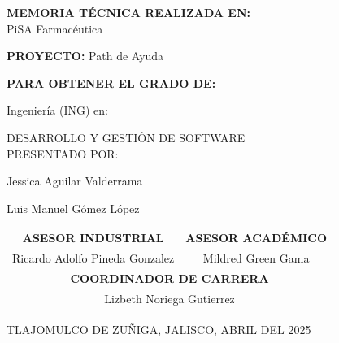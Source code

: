 \documentclass[12pt,letterpaper,spanish, xcolor=table]{report}
\begin{document}
\begin{center}
	
\large{\textbf{MEMORIA TÉCNICA REALIZADA EN:}}
 \\ PiSA Farmacéutica

\centerline{\hbox{}}

\large{\textbf{PROYECTO:} Path de Ayuda}

\vspace{0.1in}
\large{\textbf{PARA OBTENER EL GRADO DE:}}

\large{Ingeniería (ING) en:}
\vspace{0.05in}

\large{DESARROLLO Y GESTIÓN DE SOFTWARE}
\\
\large{PRESENTADO POR:}

Jessica Aguilar Valderrama %

Luis Manuel Gómez López %

\vspace{0.2in}

\begin{tabular}{cc}
	\vspace{0.2in}
	\textbf{ASESOR INDUSTRIAL} & \textbf{ASESOR ACADÉMICO} \\
	
	Ricardo Adolfo Pineda Gonzalez & Mildred Green Gama\\
	\multicolumn{2}{c}{\textbf{COORDINADOR DE CARRERA}
	\vspace{0.2in}
	} \\
	
	\multicolumn{2}{c}{
			Lizbeth Noriega Gutierrez }
	\end{tabular}
	
\end{center}
\begin{flushright}\small{ TLAJOMULCO DE ZUÑIGA, JALISCO, ABRIL DEL 2025} \end{flushright}

\newpage




\end{document}
